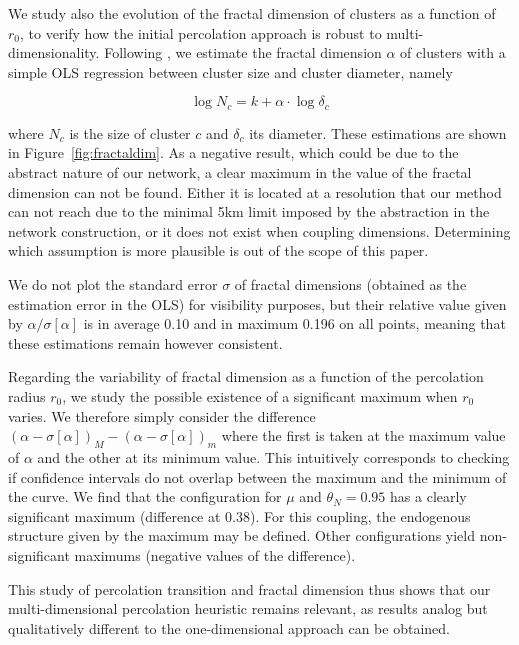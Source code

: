 \documentclass{jimis-en}
\begin{document}
We study also the evolution of the fractal dimension of clusters as a function of $r_0$, to verify how the initial percolation approach is robust to multi-dimensionality. Following \cite{arcaute2016cities}, we estimate the fractal dimension $\alpha$ of clusters with a simple OLS regression between cluster size and cluster diameter, namely 

\begin{equation}
\log N_c = k + \alpha \cdot \log \delta_c
\end{equation}

where $N_c$ is the size of cluster $c$ and $\delta_c$ its diameter. These estimations are shown in Figure~\ref{fig:fractaldim}. As a negative result, which could be due to the abstract nature of our network, a clear maximum in the value of the fractal dimension can not be found. Either it is located at a resolution that our method can not reach due to the minimal 5km limit imposed by the abstraction in the network construction, or it does not exist when coupling dimensions. Determining which assumption is more plausible is out of the scope of this paper.

We do not plot the standard error $\sigma$ of fractal dimensions (obtained as the estimation error in the OLS) for visibility purposes, but their relative value given by $\alpha / \sigma\left[\alpha\right]$ is in average 0.10 and in maximum 0.196 on all points, meaning that these estimations remain however consistent.

Regarding the variability of fractal dimension as a function of the percolation radius $r_0$, we study the possible existence of a significant maximum when $r_0$ varies. We therefore simply consider the difference $(\alpha - \sigma\left[\alpha\right])_M - (\alpha - \sigma\left[\alpha\right])_m$ where the first is taken at the maximum value of $\alpha$ and the other at its minimum value. This intuitively corresponds to checking if confidence intervals do not overlap between the maximum and the minimum of the curve. We find that the configuration for $\mu$ and $\theta_N=0.95$ has a clearly significant maximum (difference at 0.38). For this coupling, the endogenous structure given by the maximum may be defined. Other configurations yield non-significant maximums (negative values of the difference).


This study of percolation transition and fractal dimension thus shows that our multi-dimensional percolation heuristic remains relevant, as results analog but qualitatively different to the one-dimensional approach can be obtained.
\end{document}
